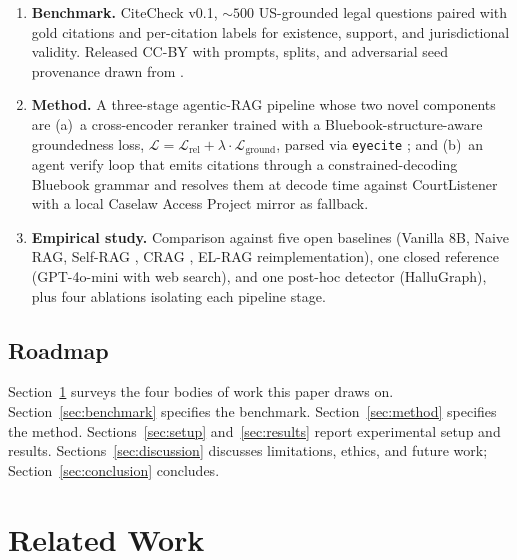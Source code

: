 \documentclass[11pt]{article}
\begin{document}
\begin{enumerate}
  \item \textbf{Benchmark.} CiteCheck v0.1, ${\sim}500$ US-grounded
        legal questions paired with gold citations and per-citation
        labels for existence, support, and jurisdictional validity.
        Released CC-BY with prompts, splits, and adversarial seed
        provenance drawn from \citet{charlotin2025tracker}.
  \item \textbf{Method.} A three-stage agentic-RAG pipeline whose two
        novel components are (a)~a cross-encoder reranker trained with
        a Bluebook-structure-aware groundedness loss,
        $\mathcal{L} = \mathcal{L}_{\text{rel}} + \lambda \cdot
        \mathcal{L}_{\text{ground}}$, parsed via \texttt{eyecite}
        \citep{cushman2018eyecite}; and (b)~an agent verify loop that
        emits citations through a constrained-decoding Bluebook
        grammar \citep{willard2023outlines} and resolves them at
        decode time against CourtListener with a local Caselaw Access
        Project mirror as fallback.
  \item \textbf{Empirical study.} Comparison against five open
        baselines (Vanilla 8B, Naive RAG, Self-RAG
        \citep{asai2023selfrag}, CRAG \citep{yan2024crag}, EL-RAG
        reimplementation), one closed reference (GPT-4o-mini with web
        search), and one post-hoc detector (HalluGraph), plus four
        ablations isolating each pipeline stage.
\end{enumerate}

\subsection{Roadmap}
\label{sec:intro:roadmap}

Section~\ref{sec:related} surveys the four bodies of work this paper
draws on. Section~\ref{sec:benchmark} specifies the benchmark.
Section~\ref{sec:method} specifies the method.
Sections~\ref{sec:setup} and~\ref{sec:results} report experimental
setup and results. Sections~\ref{sec:discussion} discusses
limitations, ethics, and future work; Section~\ref{sec:conclusion}
concludes.

\section{Related Work}
\label{sec:related}
\end{document}
